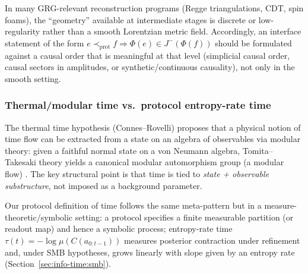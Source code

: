 \begin{remark}\label{rem:discrete-lowreg-matters}
In many GRG-relevant reconstruction programs (Regge triangulations, CDT, spin foams), the ``geometry'' available at intermediate stages is discrete or low-regularity rather than a smooth Lorentzian metric field.
Accordingly, an interface statement of the form \(e\prec_{\mathrm{prot}} f\Rightarrow \Phi(e)\in J^-(\Phi(f))\) should be formulated against a causal order that is meaningful at that level (simplicial causal order, causal sectors in amplitudes, or synthetic/continuous causality), not only in the smooth setting.\cite{Regge1961,AmbjornGoerlichJurkiewiczLoll2012NonperturbativeQG,Loll2019CDTReview,LivineOriti2003CausalSpinFoam,Engle2013ProperVertex,KunzingerSamann2018LorentzianLengthSpaces}
\end{remark}

\subsubsection{Thermal/modular time vs.\ protocol entropy-rate time}\label{sec:discussion:thermal-time}

The thermal time hypothesis (Connes--Rovelli) proposes that a physical notion of time flow can be extracted from a state on an algebra of observables via modular theory: given a faithful normal state on a von Neumann algebra, Tomita--Takesaki theory yields a canonical modular automorphism group (a modular flow) \cite{ConnesRovelli1994}. The key structural point is that time is tied to \emph{state + observable substructure}, not imposed as a background parameter.

Our protocol definition of time follows the same meta-pattern but in a measure-theoretic/symbolic setting: a protocol specifies a finite measurable partition (or readout map) and hence a symbolic process; entropy-rate time $\tau(t)=-\log\mu(C(a_{0:t-1}))$ measures posterior contraction under refinement and, under SMB hypotheses, grows linearly with slope given by an entropy rate (Section~\ref{sec:info-time:smb}).

